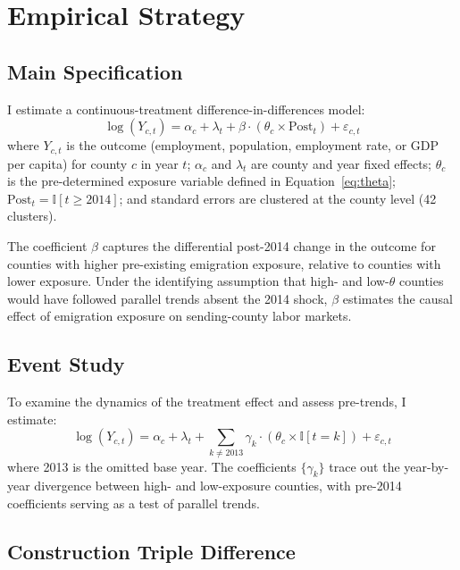 \documentclass[12pt]{article}
\newcommand{\ind}{\mathbb{I}}
\begin{document}



\section{Empirical Strategy}

\subsection{Main Specification}

I estimate a continuous-treatment difference-in-differences model:
\begin{equation}
\log(Y_{c,t}) = \alpha_c + \lambda_t + \beta \cdot (\theta_c \times \text{Post}_{t}) + \varepsilon_{c,t}
\label{eq:main}
\end{equation}
where $Y_{c,t}$ is the outcome (employment, population, employment rate, or GDP per capita) for county $c$ in year $t$; $\alpha_c$ and $\lambda_t$ are county and year fixed effects; $\theta_c$ is the pre-determined exposure variable defined in Equation~\eqref{eq:theta}; $\text{Post}_t = \ind[t \geq 2014]$; and standard errors are clustered at the county level (42 clusters).

The coefficient $\beta$ captures the differential post-2014 change in the outcome for counties with higher pre-existing emigration exposure, relative to counties with lower exposure. Under the identifying assumption that high- and low-$\theta$ counties would have followed parallel trends absent the 2014 shock, $\beta$ estimates the causal effect of emigration exposure on sending-county labor markets.

\subsection{Event Study}

To examine the dynamics of the treatment effect and assess pre-trends, I estimate:
\begin{equation}
\log(Y_{c,t}) = \alpha_c + \lambda_t + \sum_{k \neq 2013} \gamma_k \cdot (\theta_c \times \ind[t = k]) + \varepsilon_{c,t}
\label{eq:eventstudy}
\end{equation}
where 2013 is the omitted base year. The coefficients $\{\gamma_k\}$ trace out the year-by-year divergence between high- and low-exposure counties, with pre-2014 coefficients serving as a test of parallel trends.

\subsection{Construction Triple Difference}
\end{document}
